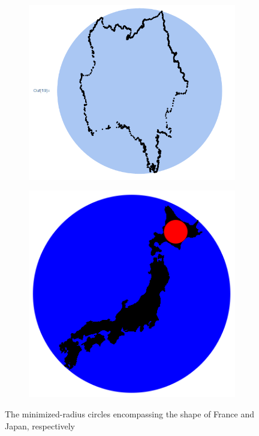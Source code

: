 \documentclass[11pt]{extarticle}
\begin{document}
    \begin{figure}[!ht]
        \begin{subfigure}{.5\textwidth}
            \centering
            \includegraphics[scale=.35]{france.png}
        \end{subfigure}
        \begin{subfigure}{.5\textwidth}
            \centering
            \includegraphics[scale=.5]{japan.png}
        \end{subfigure}
        \caption{The minimized-radius circles encompassing the shape of France and Japan, respectively}
    \end{figure}
    
\end{document}
